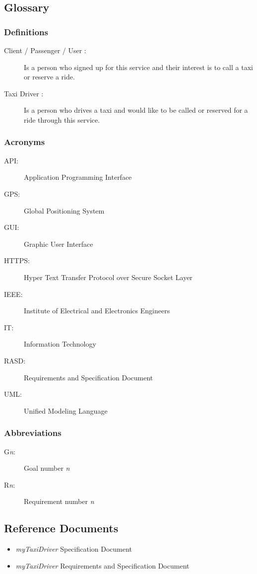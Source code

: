 \documentclass[a4paper]{article}
\begin{document}
\subsection{Glossary}
\subsubsection{Definitions}

\begin{description}
\item[Client / Passenger / User :] Is a person who signed up for this service and their interest is to call a taxi or reserve  a ride.
\item[Taxi Driver :] Is a person who drives a taxi and would like to be called or reserved for a ride through this service.
\end{description}

\subsubsection{Acronyms}

\begin{description}
\item[API:] Application Programming Interface
\item[GPS:] Global Positioning System
\item[GUI:] Graphic User Interface
\item[HTTPS:] Hyper Text Transfer Protocol over Secure Socket Layer
\item[IEEE:] Institute of Electrical and Electronics Engineers
\item[IT:] Information Technology
\item[RASD: ] Requirements and Specification Document
\item[UML:] Unified Modeling Language
\end{description}

\subsubsection{Abbreviations}

\begin{description}
\item[G\emph{n}:] Goal number \emph{n}
\item[R\emph{n}:] Requirement number \emph{n}
\end{description}

\subsection{Reference Documents}
\begin{itemize}
\item \emph{myTaxiDriver} Specification Document
\item \emph{myTaxiDriver} Requirements and Specification Document
\end{itemize}
\end{document}

